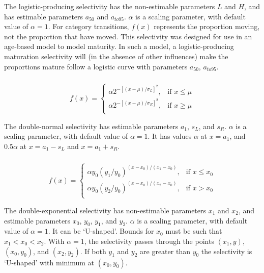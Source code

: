 The logistic-producing selectivity has the non-estimable parameters $L$ and $H$, and has estimable parameters $a_{50}$ and $a_{to95}$. $\alpha$ is a scaling parameter, with default value of $\alpha = 1$. For category transitions, $f(x)$ represents the proportion moving, not the proportion that have moved. This selectivity was designed for use in an age-based model to model maturity. In such a model, a logistic-producing maturation selectivity will (in the absence of other influences) make the proportions mature follow a logistic curve with parameters $a_{50}$, $a_{to95}$.

\subsubsection[Double-normal]{}

\begin{equation}
  f(x) = \begin{cases}
    \alpha 2^{-[(x- \mu)/\sigma_L ]^2}, & \text{if $x \leq \mu$} \\
    \alpha 2^{-[(x- \mu)/\sigma_R ]^2}, & \text{if $x \ge \mu$}\\
  \end{cases}
\end{equation} 

The double-normal selectivity has estimable parameters $a_1$, $s_L$, and $s_R$. $\alpha$ is a scaling parameter, with default value of $\alpha = 1$. It has values $\alpha$ at $x=a_1$, and $0.5 \alpha$ at $x=a_1-s_L$ and $x=a_1+s_R$. 

\subsubsection[Double-exponential]{}

\begin{equation} 
f(x)=\begin{cases}
	  \alpha y_0(y_1 / y_0)^{(x-x_0)/(x_1-x_0)}, & \text{if $x \le x_0$} \\
	  \alpha y_0(y_2 / y_0)^{(x-x_0)/(x_2-x_0)}, & \text{if $x > x_0$} \\
  \end{cases}
\end{equation}

The double-exponential selectivity has non-estimable parameters $x_1$ and $x_2$, and estimable parameters $x_0$, $y_0$, $y_1$, and $y_2$.  $\alpha$ is a scaling parameter, with default value of $\alpha = 1$. It can be `U-shaped'. Bounds for $x_0$ must be such that $x_1 < x_0 < x_2$. With $\alpha=1$, the selectivity passes through the points $(x_1, y)$, $(x_0, y_0)$, and $(x_2, y_2)$. If both $y_1$ and $y_2$ are greater than $y_0$ the selectivity is `U-shaped' with minimum at $(x_0, y_0)$.

